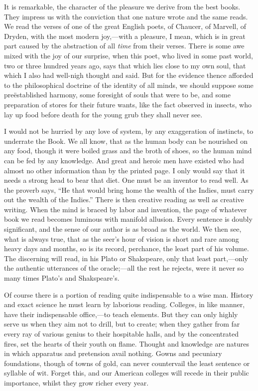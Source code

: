 It is remarkable, the character of the pleasure we derive from the
best books. They impress us with the conviction that one nature wrote
and the same reads. We read the verses of one of the great English
poets, of Chaucer, of Marvell,  of Dryden, with the most
modern joy,---with a pleasure, I mean, which is in great part caused
by the abstraction of all \textit{time} from their verses. There is
some awe mixed with the joy of our surprise, when this poet, who lived
in some past world, two or three hundred years ago, says that which
lies close to my own soul, that which I also had well-nigh thought and
said. But for the evidence thence afforded to the philosophical
doctrine of the identity of all minds, we should suppose some
pre\"{e}stablished harmony, some foresight of souls that were to be,
and some preparation of stores for their future wants, like the fact
observed in insects, who lay up food before death for the young grub
they shall never see.

I would not be hurried by any love of system, by any exaggeration of
instincts, to underrate the Book. We all know, that as the human body
can be nourished on any food, though it were boiled grass and the
broth of shoes, so the human mind can be fed by any knowledge. And
great and heroic men have existed who had almost no other information
than by the printed page. I only would say that it needs a strong head
to bear that diet. One must be an inventor to read well. As the
proverb says, ``He that would bring home the wealth of the Indies,
must  carry out the wealth of the Indies.'' There is then
creative reading as well as creative writing. When the mind is braced
by labor and invention, the page of whatever book we read becomes
luminous with manifold allusion. Every sentence is doubly significant,
and the sense of our author is as broad as the world. We then see,
what is always true, that as the seer's hour of vision is short and
rare among heavy days and months, so is its record, perchance, the
least part of his volume. The discerning will read, in his Plato or
Shakspeare, only that least part,---only the authentic utterances of
the or\-a\-cle;---all the rest he rejects, were it never so many times
Plato's and Shakspeare's.

Of course there is a portion of reading quite indispensable to a wise
man. History and exact science he must learn by laborious reading.
Colleges, in like manner, have their indispensable of\-fice,---to
teach elements. But they can only highly serve us when they aim not to
drill, but to create; when they gather from far every ray of various
genius to their hospitable halls, and by the concentrated fires, set
the hearts of their youth on flame. Thought and knowledge are natures
in which apparatus and pretension avail nothing. Gowns and pecuniary
foundations,  though of towns of gold, can never countervail
the least sentence or syllable of wit. Forget this, and our American
colleges will recede in their public importance, whilst they grow
richer every year.

